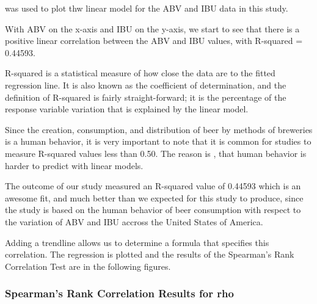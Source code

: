 \documentclass[]{article}
\newenvironment{Shaded}{\begin{snugshade}}{\end{snugshade}}
\newcommand{\DecValTok}[1]{\textcolor[rgb]{0.00,0.00,0.81}{#1}}
\newcommand{\FloatTok}[1]{\textcolor[rgb]{0.00,0.00,0.81}{#1}}
\newcommand{\StringTok}[1]{\textcolor[rgb]{0.31,0.60,0.02}{#1}}
\newcommand{\OperatorTok}[1]{\textcolor[rgb]{0.81,0.36,0.00}{\textbf{#1}}}
\newcommand{\NormalTok}[1]{#1}
\begin{document}
was used to plot thw linear model for the ABV and IBU data in this
study.

With ABV on the x-axis and IBU on the y-axis, we start to see that there
is a positive linear correlation between the ABV and IBU values, with
R-squared = 0.44593.

R-squared is a statistical measure of how close the data are to the
fitted regression line. It is also known as the coefficient of
determination, and the definition of R-squared is fairly
straight-forward; it is the percentage of the response variable
variation that is explained by the linear model.

Since the creation, consumption, and distribution of beer by methods of
breweries is a human behavior, it is very important to note that it is
common for studies to measure R-squared values less than 0.50. The
reason is , that human behavior is harder to predict with linear models.

The outcome of our study measured an R-squared value of 0.44593 which is
an awesome fit, and much better than we expected for this study to
produce, since the study is based on the human behavior of beer
consumption with respect to the variation of ABV and IBU accross the
United States of America.

Adding a trendline allows us to determine a formula that specifies this
correlation. The regression is plotted and the results of the Spearman's
Rank Correlation Test are in the following figures.

\subsubsection{Spearman's Rank Correlation Results for
rho}\label{spearmans-rank-correlation-results-for-rho}

\begin{Shaded}
\end{Shaded}
\end{document}
